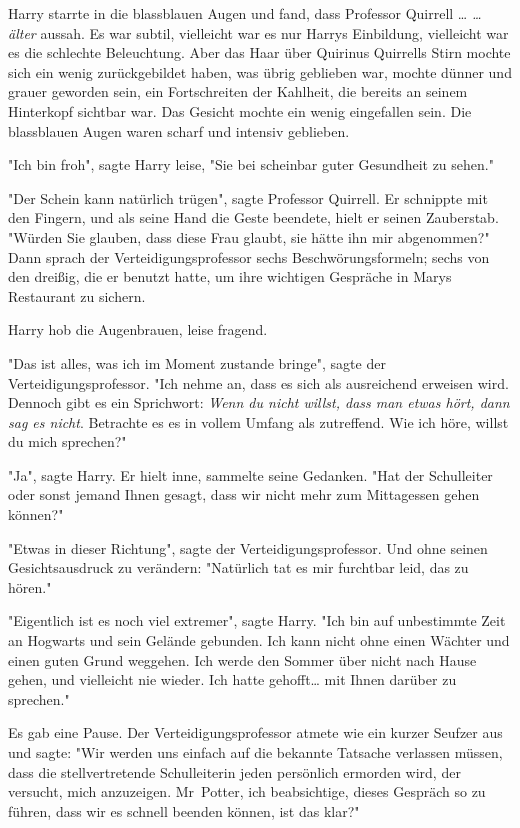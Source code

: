 {Harry starrte in die blassblauen Augen und fand, dass Professor Quirrell … \emph{… älter} aussah. Es war subtil, vielleicht war es nur Harrys Einbildung, vielleicht war es die schlechte Beleuchtung. Aber das Haar über Quirinus Quirrells Stirn mochte sich ein wenig zurückgebildet haben, was übrig geblieben war, mochte dünner und grauer geworden sein, ein Fortschreiten der Kahlheit, die bereits an seinem Hinterkopf sichtbar war. Das Gesicht mochte ein wenig eingefallen sein. Die blassblauen Augen waren scharf und intensiv geblieben.

"Ich bin froh", sagte Harry leise, "Sie bei scheinbar guter Gesundheit zu sehen."

"Der Schein kann natürlich trügen", sagte Professor Quirrell. Er schnippte mit den Fingern, und als seine Hand die Geste beendete, hielt er seinen Zauberstab. "Würden Sie glauben, dass diese Frau glaubt, sie hätte ihn mir abgenommen?" Dann sprach der Verteidigungsprofessor sechs Beschwörungsformeln; sechs von den dreißig, die er benutzt hatte, um ihre wichtigen Gespräche in Marys Restaurant zu sichern.

Harry hob die Augenbrauen, leise fragend.

"Das ist alles, was ich im Moment zustande bringe", sagte der Verteidigungsprofessor. "Ich nehme an, dass es sich als ausreichend erweisen wird. Dennoch gibt es ein Sprichwort: \emph{Wenn du nicht willst, dass man etwas hört, dann sag es nicht}. Betrachte es es in vollem Umfang als zutreffend. Wie ich höre, willst du mich sprechen?"

"Ja", sagte Harry. Er hielt inne, sammelte seine Gedanken. "Hat der Schulleiter oder sonst jemand Ihnen gesagt, dass wir nicht mehr zum Mittagessen gehen können?"

"Etwas in dieser Richtung", sagte der Verteidigungsprofessor. Und ohne seinen Gesichtsausdruck zu verändern: "Natürlich tat es mir furchtbar leid, das zu hören."

"Eigentlich ist es noch viel extremer", sagte Harry. "Ich bin auf unbestimmte Zeit an Hogwarts und sein Gelände gebunden. Ich kann nicht ohne einen Wächter und einen guten Grund weggehen. Ich werde den Sommer über nicht nach Hause gehen, und vielleicht nie wieder. Ich hatte gehofft… mit Ihnen darüber zu sprechen."

Es gab eine Pause. Der Verteidigungsprofessor atmete wie ein kurzer Seufzer aus und sagte: "Wir werden uns einfach auf die bekannte Tatsache verlassen müssen, dass die stellvertretende Schulleiterin jeden persönlich ermorden wird, der versucht, mich anzuzeigen. Mr~Potter, ich beabsichtige, dieses Gespräch so zu führen, dass wir es schnell beenden können, ist das klar?"

}

